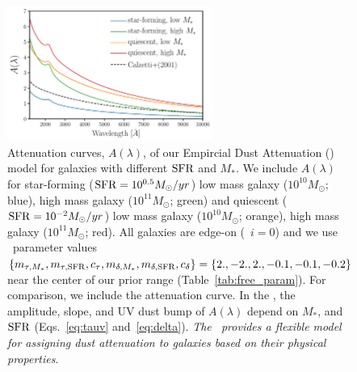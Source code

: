 \begin{figure}
\begin{center}
    \includegraphics[width=0.6\textwidth]{figs/dems.pdf}
    \caption{\label{fig:dem_av}
    Attenuation curves, $A(\lambda)$, of our Empircial Dust Attenuation (\eda)
    model for galaxies with different ${\rm SFR}$ and $M_*$. We include $A(\lambda)$ for 
    star-forming (${\rm SFR}=10^{0.5}M_\odot/yr$) low mass galaxy ($10^{10}M_\odot$;
    blue), high mass galaxy ($10^{11}M_\odot$; green) and quiescent
    (${\rm SFR}=10^{-2}M_\odot/yr$) low mass galaxy ($10^{10}M_\odot$; orange), 
    high mass galaxy ($10^{11}M_\odot$; red). All galaxies are edge-on
    (\ie~$i=0$) and we use \eda~parameter values $\{m_{\tau,M_*}, m_{\tau,{\rm SFR}}, c_\tau, m_{\delta,M_*}, m_{\delta,{\rm SFR}},
    c_\delta\} = \{2., -2., 2., -0.1, -0.1, -0.2\}$ near the center of our prior range
    (Table~\ref{tab:free_param}). For comparison, we include the \cite{calzetti2001} 
    attenuation curve. In the \eda, the amplitude, slope, and UV dust bump of
    $A(\lambda)$ depend on $M_*$, and ${\rm SFR}$ (Eqs.~\ref{eq:tauv}
    and~\ref{eq:delta}). {\em The \eda~provides a flexible model for
    assigning dust attenuation to galaxies based on their physical properties}.
    } 
\end{center}
\end{figure}


